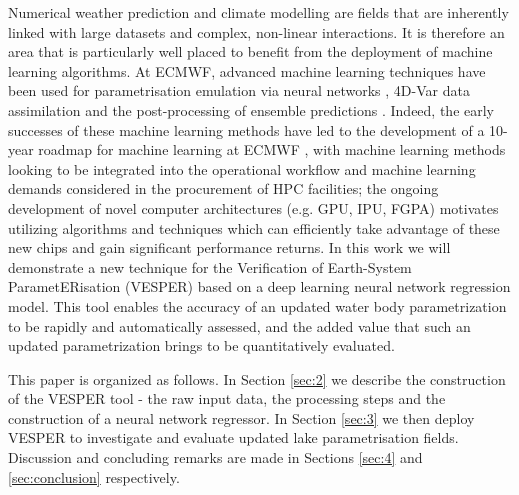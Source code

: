 \documentclass[hess, manuscript]{copernicus}
\begin{document}
\noindent Numerical weather prediction and climate modelling are fields that are inherently linked with large datasets and complex, non-linear interactions. It is therefore an area that is particularly well placed to benefit from the deployment of machine learning algorithms. At ECMWF, advanced machine learning techniques have been used for parametrisation emulation via neural networks \citep{Chantry2021}, 4D-Var data assimilation \citep{Hatfield2021} and the post-processing of ensemble predictions \citep{Hewson2021}. Indeed, the early successes of these machine learning methods have led to the development of a 10-year roadmap for machine learning at ECMWF \citep{p19877}, with machine learning methods looking to be integrated into the operational workflow and machine learning demands considered in the procurement of HPC facilities; the ongoing development of novel computer architectures (e.g. GPU, IPU, FGPA) motivates utilizing algorithms and techniques which can efficiently take advantage of these new chips and gain significant performance returns. In this work we will demonstrate a new technique for the Verification of Earth-System ParametERisation (VESPER) based on a deep learning neural network regression model. This tool enables the accuracy of an updated water body parametrization to be rapidly and automatically assessed, and the added value that such an updated parametrization brings to be quantitatively evaluated. \newline 


\noindent This paper is organized as follows. In Section \ref{sec:2} we describe the construction of the VESPER tool - the raw input data, the processing steps and the construction of a neural network regressor. In Section \ref{sec:3} we then deploy VESPER to investigate and evaluate updated lake parametrisation fields. Discussion and concluding remarks are made in Sections \ref{sec:4} and \ref{sec:conclusion} respectively. 


\newpage
\end{document}
